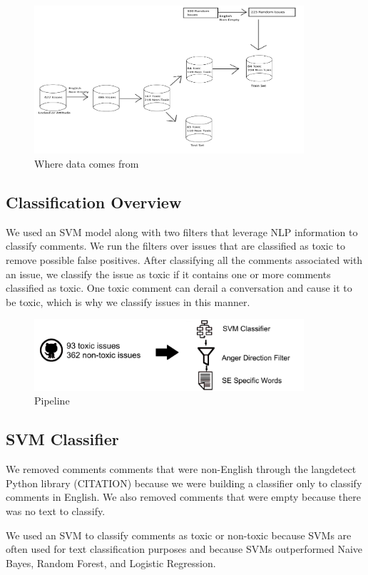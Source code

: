 \documentclass[conference]{IEEEtran}
\begin{document}
\begin{figure}
	\includegraphics[width=10cm]{data_flow.png}
	\caption{Where data comes from}
\end{figure}

\subsection{Classification Overview} 

We used an SVM model along with two filters that leverage NLP information to classify comments. We run the filters over issues that are classified as toxic to remove possible false positives. After classifying all the comments associated with an issue, we classify the issue as toxic if it contains one or more comments classified as toxic. One toxic comment can derail a conversation and cause it to be toxic, which is why we classify issues in this manner.  

\begin{figure}
	\includegraphics[width=10cm]{pipeline.png}
	\caption{Pipeline}
\end{figure}

\subsection{SVM Classifier}

We removed comments comments that were non-English through the langdetect Python library (CITATION) because we were building a classifier only to classify comments in English. We also removed comments that were empty because there was no text to classify. 

We used an SVM to classify comments as toxic or non-toxic because SVMs are often used for text classification purposes \cite{joachims1998text} and because SVMs outperformed Naive Bayes, Random Forest, and Logistic Regression. 
\end{document}
